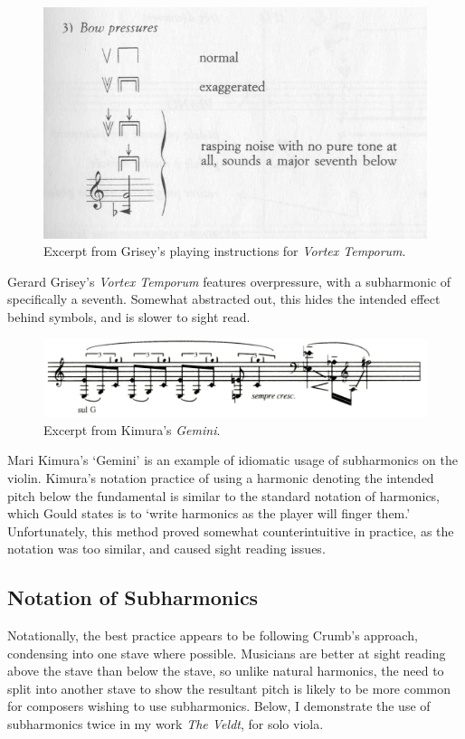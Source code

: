 \begin{figure}
    \includegraphics[width=\linewidth]{./resources/griseyVortexTemporum.jpg}
    \caption{Excerpt from Grisey's playing instructions for \emph{Vortex Temporum}.}
\label{fig:Excerpt from Grisey's playing instructions for Vortex Temporum}
  \end{figure}
Gerard Grisey's \emph{Vortex Temporum} features overpressure, with a subharmonic of specifically a seventh. Somewhat abstracted out, this hides the intended effect behind symbols, and is slower to sight read.

\begin{figure}
    \includegraphics[width=\linewidth]{./resources/kimura_gemini.png}
    \caption{Excerpt from Kimura's \emph{Gemini}.}
\label{fig:Excerpt from Kimura's Gemini}
  \end{figure}
  Mari Kimura's `Gemini' is an example of idiomatic usage of subharmonics on the violin. Kimura's notation practice of using a harmonic denoting the intended pitch below the fundamental is similar to the standard notation of harmonics, which Gould states is to `write harmonics as the player will finger them.'\autocite[413]{gouldBars2011} Unfortunately, this method proved somewhat counterintuitive in practice, as the notation was too similar, and caused sight reading issues.

\subsection{Notation of Subharmonics}
Notationally, the best practice appears to be following Crumb's approach, condensing into one stave where possible. Musicians are better at sight reading above the stave than below the stave, so unlike natural harmonics, the need to split into another stave to show the resultant pitch is likely to be more common for composers wishing to use subharmonics. Below, I demonstrate the use of subharmonics twice in my work \emph{The Veldt}, for solo viola.

